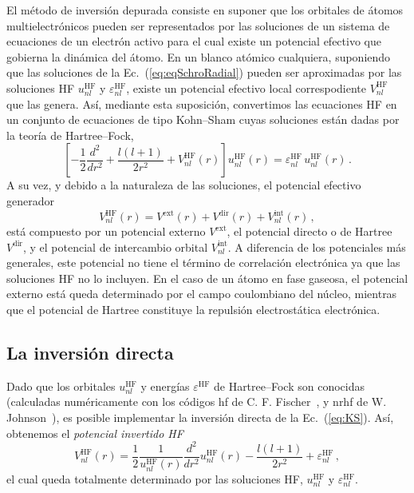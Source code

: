 El método de inversión depurada consiste en suponer que los orbitales
de átomos multielectrónicos pueden ser representados por las soluciones
de un sistema de ecuaciones de un electrón activo para el cual existe 
un potencial efectivo que gobierna la dinámica del átomo. 
En un blanco atómico cualquiera, suponiendo que las soluciones de la 
Ec.~(\ref{eq:eqSchroRadial}) pueden ser aproximadas por las soluciones 
HF $u_{nl}^{\mathrm{HF}}$ y $\varepsilon_{nl}^{\mathrm{HF}}$, existe un 
potencial efectivo local correspodiente $V_{nl}^{\mathrm{HF}}$ que las 
genera. Así, mediante esta suposición, convertimos las ecuaciones HF en 
un conjunto de ecuaciones de tipo Kohn--Sham cuyas soluciones están 
dadas por la teoría de Hartree--Fock,
\begin{equation}
\left[ 
-\frac{1}{2}\frac{d^{2}}{dr^{2}} + \frac{l(l+1)}{2r^{2}} + 
V_{nl}^{\mathrm{HF}}(r) 
\right] u_{nl}^{\mathrm{HF}}(r)
   = \varepsilon_{nl}^{\mathrm{HF}}\, u_{nl}^{\mathrm{HF}}(r) \, .
\label{eq:KS}
\end{equation}
A su vez, y debido a la naturaleza de las soluciones, el potencial 
efectivo generador
\begin{equation}
V_{nl}^{\mathrm{HF}}(r) = V^{\mathrm{ext}}(r) + 
V^{\mathrm{dir}}(r) + V_{nl}^{\mathrm{int}}(r) \, ,  
\label{eq:veff}
\end{equation}
está compuesto por un potencial externo $V^{\mathrm{ext}}$, 
el potencial directo o de Hartree $V^{\mathrm{dir}}$, y el potencial
de intercambio orbital $V_{nl}^{\mathrm{int}}$. A diferencia de los
potenciales más generales, este potencial no tiene el término de 
correlación electrónica ya que las soluciones HF no lo incluyen. En el 
caso de un átomo en fase gaseosa, el potencial externo está queda 
determinado por el campo coulombiano del núcleo, mientras que el 
potencial de Hartree constituye la repulsión electrostática electrónica. 


\subsection{La inversión directa}
\label{subsec:inversion}

Dado que los orbitales $u_{nl}^{\mathrm{HF}}$ y energías  
$\varepsilon^{\mathrm{HF}}$ de Hartree--Fock son conocidas (calculadas 
numéricamente con los códigos {\sc hf} de C. F. Fischer~\cite{FroeseFischer:97}, 
y {\sc nrhf} de W. Johnson~\cite{Johnson:07}), es posible implementar 
la inversión directa de la Ec.~(\ref{eq:KS}). Así, obtenemos el 
\textit{potencial invertido HF} 
\begin{equation}
V_{nl}^{\mathrm{HF}}(r) = 
\frac{1}{2}\frac{1}{u_{nl}^{\mathrm{HF}}(r)}
\frac{d^2}{dr^{2}}u_{nl}^{\mathrm{HF}}(r) - 
\frac{l(l+1)}{2r^{2}}+\varepsilon _{nl}^{\mathrm{HF}} \,,
\label{eq:VHF}
\end{equation}
el cual queda totalmente determinado por las soluciones HF,
$u_{nl}^{\mathrm{HF}}$ y $\varepsilon_{nl}^{\mathrm{HF}}$.

